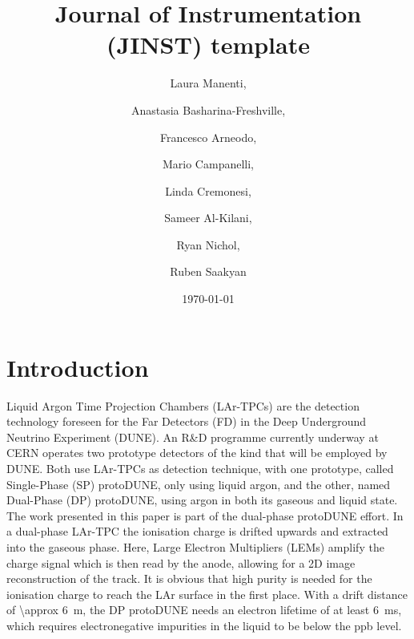 \documentclass[a4paper,11pt]{article}
\date{\today}
\title{Journal of Instrumentation (JINST) template}
\author[a,b,1]{Laura Manenti,\note{Corresponding author.}}
\author[b]{Anastasia Basharina-Freshville,}
\author[b]{Francesco Arneodo,}
\author[b]{Mario Campanelli,}
\author[b]{Linda Cremonesi,}
\author[b]{Sameer Al-Kilani,}
\author[b]{Ryan Nichol,}
\author[b]{Ruben Saakyan}
\affiliation[a]{One University,\\some-street, Country}
\affiliation[b]{Another University,\\different-address, Country}
\begin{document}
\maketitle
\flushbottom

\section{Introduction}

Liquid Argon Time Projection Chambers (LAr-TPCs) are the detection technology foreseen for the Far Detectors (FD) in the Deep Underground Neutrino Experiment (DUNE). 
An R\&D programme currently underway at CERN operates two prototype detectors of the kind that will be employed by DUNE. Both use LAr-TPCs as detection technique, with one prototype, called Single-Phase (SP) protoDUNE, only using liquid argon, and the other, named Dual-Phase (DP) protoDUNE, using argon in both its gaseous and liquid state.
The work presented in this paper is part of the dual-phase protoDUNE effort. In a dual-phase LAr-TPC the ionisation charge is drifted upwards and extracted into the gaseous phase. Here, Large Electron Multipliers (LEMs) amplify the charge signal which is then read by the anode, allowing for a 2D image reconstruction of the track. It is obvious that high purity is needed for the ionisation charge to reach the LAr surface in the first place. 
With a drift distance of \SI{\approx 6}{\m}, the DP protoDUNE needs an electron lifetime of at least \SI{6}{ms}, which requires electronegative impurities in the liquid to be below the ppb level. 
\end{document}
